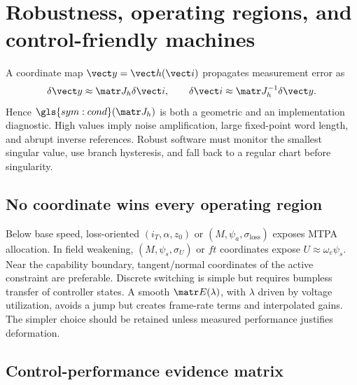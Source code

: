 \section{Robustness, operating regions, and control-friendly machines}
\label{sec:coordinate-robustness}

A coordinate map \(\vect y=\vect h(\vect i)\) propagates measurement error as
\[
 \delta\vect y\approx\matr J_h\delta\vect i,\qquad
 \delta\vect i\approx\matr J_h^{-1}\delta\vect y.
\]
Hence \(\gls{sym:cond}(\matr J_h)\) is both a geometric and an implementation
diagnostic. High values imply noise amplification, large fixed-point word
length, and abrupt inverse references. Robust software must monitor the
smallest singular value, use branch hysteresis, and fall back to a regular
chart before singularity.

\subsection{No coordinate wins every operating region}

Below base speed, loss-oriented \((i_T,\alpha,z_0)\) or
\((M,\psi_a,\sigma_{\mathrm{loss}})\) exposes MTPA allocation. In field
weakening, \((M,\psi_s,\sigma_U)\) or \(ft\) coordinates expose
\(U\approx\omega_e\psi_s\). Near the capability boundary, tangent/normal
coordinates of the active constraint are preferable. Discrete switching is
simple but requires bumpless transfer of controller states. A smooth
\(\matr E(\lambda)\), with \(\lambda\) driven by voltage utilization, avoids
a jump but creates frame-rate terms and interpolated gains. The simpler choice
should be retained unless measured performance justifies deformation.

\subsection{Control-performance evidence matrix}

